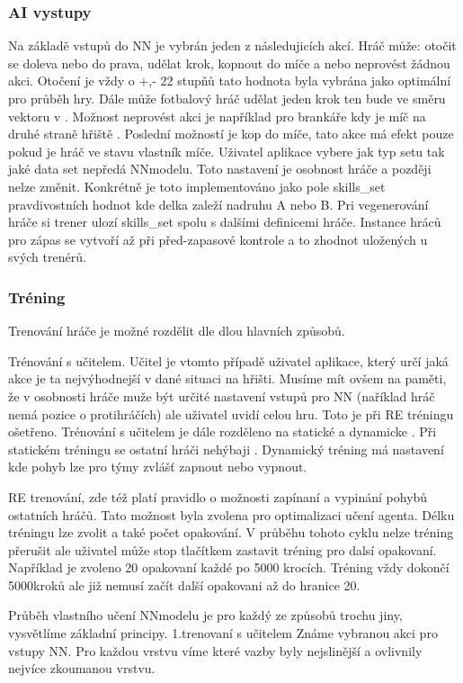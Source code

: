 \documentclass[
  program=ainfk,
  biblatex,
  language=czech,
  figures=true,
  tables ,
  sourcecodes=true,
  glossaries=true,
  index
]{kidiplom}
\begin{document}
\subsubsection{ AI vystupy} 
 Na základě vstupů do NN je vybrán jeden z následujicích akcí. Hráč může: otočit se doleva nebo do prava, udělat krok, kopnout do míče a nebo neprovést žádnou akci. Otočení je vždy o +,- 22 stupňů tato hodnota byla vybrána jako optimální pro průběh hry. Dále může fotbalový hráč udělat jeden krok ten bude ve směru vektoru v . Možnost neprovést akci je například pro brankáře kdy je míč na druhé straně hřiště . Poslední možností je kop do míče, tato akce má efekt pouze pokud je hráč ve stavu vlastník míče.
Uživatel aplikace vybere jak typ setu tak jaké data set nepředá NNmodelu. Toto nastavení je osobnost hráče a později nelze změnit.
Konkrétně je toto implementováno jako pole skills{\_}set pravdivostních hodnot kde delka zaleží nadruhu A nebo B. Pri vegenerování hráče si trener ulozí skills{\_}set spolu s dalšími definicemi hráče. Instance hráců pro zápas se vytvoří až při před-zapasové kontrole a to zhodnot uložených u svých trenérů.

 
\subsubsection{ Tréning } 
Trenování hráče je možné rozdělit dle dlou hlavních způsobů.

 Trénování s učitelem. Učitel je vtomto případě uživatel aplikace, který určí jaká akce je ta nejvýhodnejší v dané situaci na hřišti. Musíme mít ovšem na paměti, že v osobnosti hráče muže být určité nastavení vstupů pro NN (naříklad hráč nemá pozice o protihráčích) ale uživatel uvidí celou hru. Toto je při RE tréningu ošetřeno. Trénování s učitelem je dále rozděleno na statické a dynamicke . Při statickém tréningu se ostatní hráči nehýbaji . Dynamický tréning má nastavení kde pohyb lze pro týmy zvlášť zapnout nebo vypnout. 
 
RE trenování, zde též platí pravidlo o možnosti zapínaní a vypinání pohybů ostatních hráčů. Tato možnost byla zvolena pro optimalizaci učení agenta. Délku tréningu lze zvolit a také počet opakování. V průběhu tohoto cyklu nelze tréning přerušit ale uživatel může stop tlačítkem zastavit tréning pro dalsí opakovaní. Například je zvoleno 20 opakovaní každé po 5000 krocích. Tréning vždy dokončí 5000kroků ale již nemusí začít další opakovani až do hranice 20. 

Průběh vlastního učení NNmodelu je pro každý ze způsobů trochu jiny, vysvětlíme základní principy. 
1.trenovaní s učitelem \cite{19} 
Známe vybranou akci pro vstupy NN. Pro každou vrstvu víme které vazby byly nejslinější a ovlivnily nejvíce zkoumanou vrstvu. 
\end{document}
